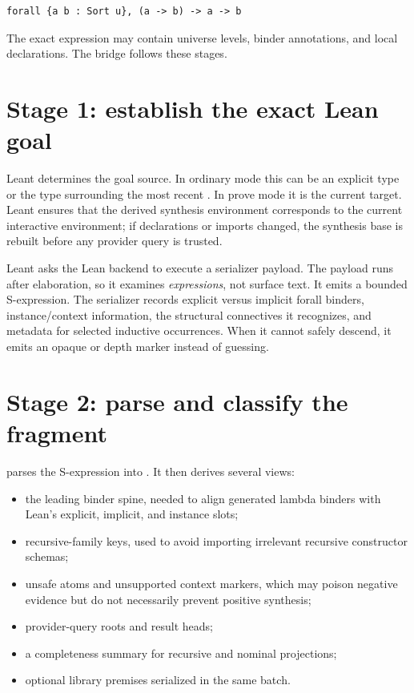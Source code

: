 \documentclass[10pt,letterpaper,oneside]{report}
\newcommand{\code}[1]{\texttt{\detokenize{#1}}}
\begin{document}
\begin{lstlisting}[language=Leanish]
forall {a b : Sort u}, (a -> b) -> a -> b
\end{lstlisting}

The exact expression may contain universe levels, binder annotations, and local declarations. The bridge follows these stages.

\section{Stage 1: establish the exact Lean goal}

Leant determines the goal source. In ordinary mode this can be an explicit type or the type surrounding the most recent \code{sorry}. In prove mode it is the current target. Leant ensures that the derived synthesis environment corresponds to the current interactive environment; if declarations or imports changed, the synthesis base is rebuilt before any provider query is trusted.

Leant asks the Lean backend to execute a serializer payload. The payload runs after elaboration, so it examines \emph{expressions}, not surface text. It emits a bounded S-expression. The serializer records explicit versus implicit forall binders, instance/context information, the structural connectives it recognizes, and metadata for selected inductive occurrences. When it cannot safely descend, it emits an opaque or depth marker instead of guessing.

\section{Stage 2: parse and classify the fragment}

\code{Leant.Synth.Fragment} parses the S-expression into \code{Frag}. It then derives several views:

\begin{itemize}
  \item the leading binder spine, needed to align generated lambda binders with Lean's explicit, implicit, and instance slots;
  \item recursive-family keys, used to avoid importing irrelevant recursive constructor schemas;
  \item unsafe atoms and unsupported context markers, which may poison negative evidence but do not necessarily prevent positive synthesis;
  \item provider-query roots and result heads;
  \item a completeness summary for recursive and nominal projections;
  \item optional library premises serialized in the same batch.
\end{itemize}
\end{document}
